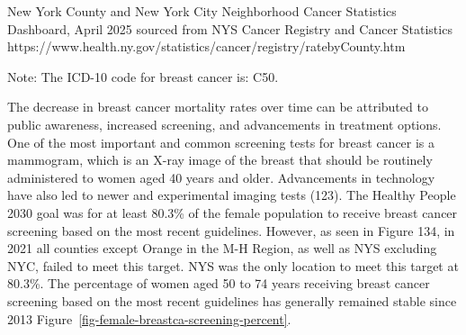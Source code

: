\documentclass[
  english,
  letterpaper,
]{report}
\begin{document}
\begin{tcolorbox}[enhanced jigsaw, breakable, leftrule=.75mm, title=\textcolor{quarto-callout-note-color}{\faInfo}\hspace{0.5em}{Source}, bottomrule=.15mm, opacityback=0, left=2mm, colback=white, bottomtitle=1mm, coltitle=black, colbacktitle=quarto-callout-note-color!10!white, colframe=quarto-callout-note-color-frame, opacitybacktitle=0.6, toptitle=1mm, titlerule=0mm, arc=.35mm, rightrule=.15mm, toprule=.15mm]

New York County and New York City Neighborhood Cancer Statistics
Dashboard, April 2025 sourced from NYS Cancer Registry and Cancer
Statistics
https://www.health.ny.gov/statistics/cancer/registry/ratebyCounty.htm

\end{tcolorbox}

\begin{tcolorbox}[enhanced jigsaw, breakable, leftrule=.75mm, title=\textcolor{quarto-callout-note-color}{\faInfo}\hspace{0.5em}{Note}, bottomrule=.15mm, opacityback=0, left=2mm, colback=white, bottomtitle=1mm, coltitle=black, colbacktitle=quarto-callout-note-color!10!white, colframe=quarto-callout-note-color-frame, opacitybacktitle=0.6, toptitle=1mm, titlerule=0mm, arc=.35mm, rightrule=.15mm, toprule=.15mm]

Note: The ICD-10 code for breast cancer is: C50.

\end{tcolorbox}

The decrease in breast cancer mortality rates over time can be
attributed to public awareness, increased screening, and advancements in
treatment options. One of the most important and common screening tests
for breast cancer is a mammogram, which is an X-ray image of the breast
that should be routinely administered to women aged 40 years and older.
Advancements in technology have also led to newer and experimental
imaging tests (123). The Healthy People 2030 goal was for at least
80.3\% of the female population to receive breast cancer screening based
on the most recent guidelines. However, as seen in Figure 134, in 2021
all counties except Orange in the M-H Region, as well as NYS excluding
NYC, failed to meet this target. NYS was the only location to meet this
target at 80.3\%. The percentage of women aged 50 to 74 years receiving
breast cancer screening based on the most recent guidelines has
generally remained stable since 2013
Figure~\ref{fig-female-breastca-screening-percent}.
\end{document}
